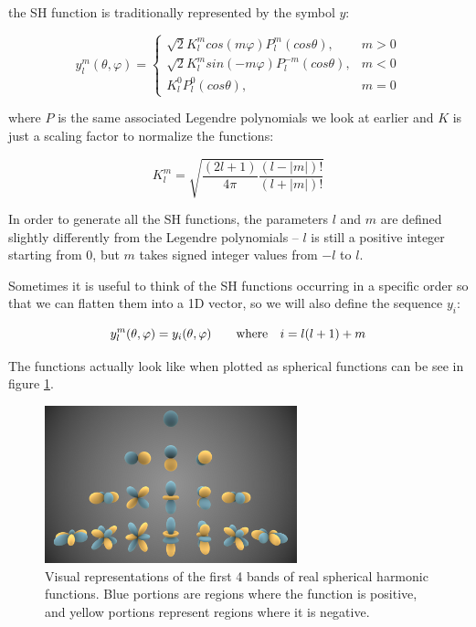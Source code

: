 the SH function is traditionally represented by the symbol $y$:

\begin{equation*}
	y^{m}_{l}(\theta,\varphi)=\begin{cases}
		\sqrt{2}K^{m}_{l}cos(m\varphi)P^{m}_{l}(cos\theta), &m>0\\
		\sqrt{2}K^{m}_{l}sin(-m\varphi)P^{-m}_{l}(cos\theta), &m<0\\
		K^{0}_{l}P^{0}_{l}(cos\theta), & m=0
	\end{cases}
\end{equation*}

where $P$ is the same associated Legendre polynomials we look at earlier and $K$ is just a scaling factor to normalize the functions:

\begin{equation*}
	K^{m}_{l}=\sqrt{\frac{(2l+1)}{4\pi}\frac{(l-|m|)!}{(l+|m|)!}}
\end{equation*}

In order to generate all the SH functions, the parameters $l$ and $m$ are defined slightly differently from the Legendre polynomials -- $l$ is still a positive integer starting from $0$, but $m$ takes signed integer values from $-l$ to $l$.

Sometimes it is useful to think of the SH functions occurring in a specific order so that we can flatten them into a 1D vector, so we will also define the sequence $y_i$:

\begin{equation*}
	y^{m}_{l}(\theta,\varphi)=y_i(\theta,\varphi) \text{\quad\quad  where\quad} i=l(l+1)+m
\end{equation*}

The functions actually look like when plotted as spherical functions can be see in figure \ref{f:sperical-harmonic}.

\begin{figure}
\sidecaption
	\includegraphics[width=0.65\textwidth]{graphics/prt/prt-4}
	\caption{Visual representations of the first 4 bands of real spherical harmonic functions. Blue portions are regions where the function is positive, and yellow portions represent regions where it is negative.}
	\label{f:sperical-harmonic}
\end{figure}



